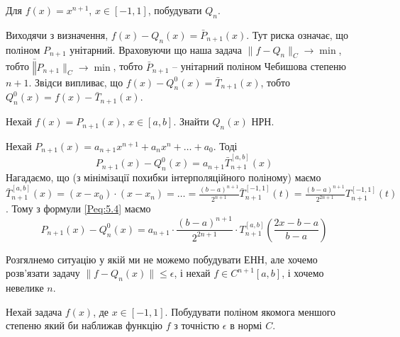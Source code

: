 \begin{example}
	Для $f(x) = x^{n + 1}$, $x \in [-1, 1]$, побудувати $Q_n$.
\end{example}

\begin{solution}
	Виходячи з визначення, $f(x) - Q_n(x) = \bar P_{n + 1}(x)$. Тут риска означає, що поліном $P_{n + 1}$ унітарний. Враховуючи що наша задача $\|f - Q_n\|_C \to \min$, тобто $\bar \|P_{n + 1}\|_C \to \min$, тобто $\bar P_{n + 1}$ -- унітарний поліном Чебишова степеню $n + 1$. Звідси випливає, що $f(x) - Q_n^0 (x) = \bar T_{n + 1}(x)$, тобто $Q_n^0 (x) = f(x) - \bar T_{n + 1}(x)$.
\end{solution}

\begin{example}
	Нехай $f(x) = P_{n + 1}(x)$, $x \in [a, b]$. Знайти $Q_n(x)$ НРН.
\end{example}

\begin{solution}
	Нехай $P_{n + 1}(x) = a_{n + 1} x^{n + 1} + a_n x^n + \ldots + a_0$. Тоді
	\begin{equation}
		\label{eq:5.4}
		P_{n + 1}(x) - Q^0_n(x) = a_{n + 1} \bar T_{n + 1}^{[a, b]}(x)
	\end{equation}
	Нагадаємо, що (з мінімізації похибки інтерполяційного поліному) маємо $\bar T_{n + 1}^{[a, b]} (x) = (x - x_0) \cdot (x - x_n) = \ldots = \frac{(b - a)^{n + 1}}{2^{n + 1}} \bar T_{n + 1}^{[-1, 1]} (t) = \frac{(b - a)^{n + 1}}{2^{2 n + 1}} T_{n + 1}^{[-1, 1]} (t)$. Тому з формули \eqref{Peq:5.4} маємо 
	\begin{equation}
		\label{eq:5.5}
		P_{n + 1}(x) - Q_n^0(x) = a_{n + 1} \cdot \frac{(b - a)^{n + 1}}{2^{2n + 1}} \cdot T_{n + 1}^{[a, b]} \left( \frac{2x - b - a}{b - a}\right)
	\end{equation}
\end{solution}

Розгялнемо ситуацію у якій ми не можемо побудувати ЕНН, але хочемо розв'язати задачу $\|f - Q_n(x)\|\le \epsilon$, і нехай  $f \in C^{n + 1}[a, b]$, і хочемо невелике $n$.

\begin{example}
	Нехай задача $f(x)$, де $x \in [-1, 1]$. Побудувати поліном якомога меншого степеню який би наближав функцію  $f$ з точністю  $\epsilon$ в нормі $C$.
\end{example}

